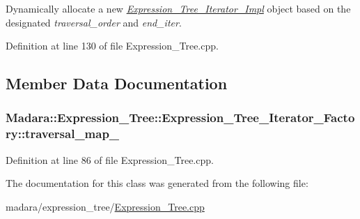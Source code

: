Dynamically allocate a new {\itshape \hyperlink{classMadara_1_1Expression__Tree_1_1Expression__Tree__Iterator__Impl}{Expression\_\-Tree\_\-Iterator\_\-Impl}\/} object based on the designated {\itshape traversal\_\-order\/} and {\itshape end\_\-iter\/}. 



Definition at line 130 of file Expression\_\-Tree.cpp.



\subsection{Member Data Documentation}
\hypertarget{classMadara_1_1Expression__Tree_1_1Expression__Tree__Iterator__Factory_aaf39c92f409756d9e9e46d0e8f0c9a65}{
\subsubsection[{traversal\_\-map\_\-}]{ {\bf Madara::Expression\_\-Tree::Expression\_\-Tree\_\-Iterator\_\-Factory::traversal\_\-map\_\-}}}
\label{d4/d93/classMadara_1_1Expression__Tree_1_1Expression__Tree__Iterator__Factory_aaf39c92f409756d9e9e46d0e8f0c9a65}


Definition at line 86 of file Expression\_\-Tree.cpp.



The documentation for this class was generated from the following file:\begin{DoxyCompactItemize}
\item 
madara/expression\_\-tree/\hyperlink{Expression__Tree_8cpp}{Expression\_\-Tree.cpp}\end{DoxyCompactItemize}
